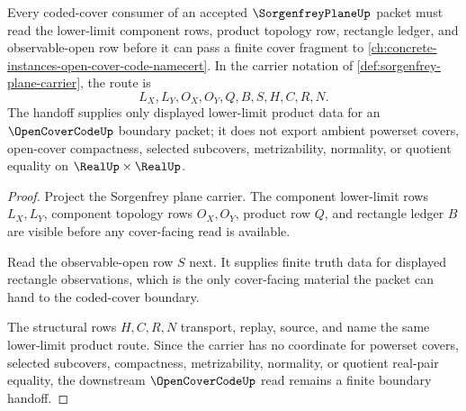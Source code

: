 \begin{theorem}
\label{thm:sorgenfrey-plane-open-cover-code-boundary-route}
Every coded-cover consumer of an accepted $\SorgenfreyPlaneUp$ packet must read the lower-limit component rows, product topology row, rectangle ledger, and observable-open row before it can pass a finite cover fragment to \autoref{ch:concrete-instances-open-cover-code-namecert}. In the carrier notation of \autoref{def:sorgenfrey-plane-carrier}, the route is
$$
L_X,L_Y,O_X,O_Y,Q,B,S,H,C,R,N .
$$
The handoff supplies only displayed lower-limit product data for an $\OpenCoverCodeUp$ boundary packet; it does not export ambient powerset covers, open-cover compactness, selected subcovers, metrizability, normality, or quotient equality on $\RealUp\times\RealUp$.
\end{theorem}
\begin{proof}
Project the Sorgenfrey plane carrier. The component lower-limit rows $L_X,L_Y$, component topology rows $O_X,O_Y$, product row $Q$, and rectangle ledger $B$ are visible before any cover-facing read is available.

Read the observable-open row $S$ next. It supplies finite truth data for displayed rectangle observations, which is the only cover-facing material the packet can hand to the coded-cover boundary.

The structural rows $H,C,R,N$ transport, replay, source, and name the same lower-limit product route. Since the carrier has no coordinate for powerset covers, selected subcovers, compactness, metrizability, normality, or quotient real-pair equality, the downstream $\OpenCoverCodeUp$ read remains a finite boundary handoff.
\end{proof}
